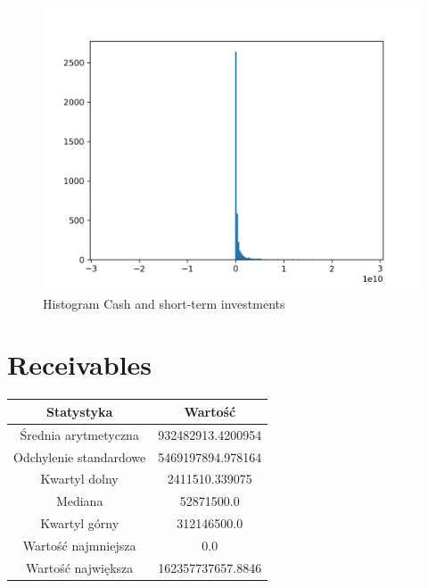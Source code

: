 \documentclass{article}
\begin{document}
\begin{figure}[h!]
    \includegraphics[width=\linewidth]{variables/Cash and short-term investments.png}
    \caption{Histogram Cash and short-term investments }
\end{figure}\section{ Receivables }

\begin{center}
    \begin{tabular}{|c | c|} 
    \hline
    Statystyka & Wartość \\
    \hline\hline
    Średnia arytmetyczna & 932482913.4200954 \\ 
    \hline
    Odchylenie standardowe & 5469197894.978164 \\
    \hline
    Kwartyl dolny & 2411510.339075 \\
    \hline
    Mediana & 52871500.0 \\
    \hline
    Kwartyl górny & 312146500.0 \\
    \hline
    Wartość najmniejsza & 0.0 \\
    \hline
    Wartość największa & 162357737657.8846 \\
    \hline
   \end{tabular}
\end{center}
\end{document}
